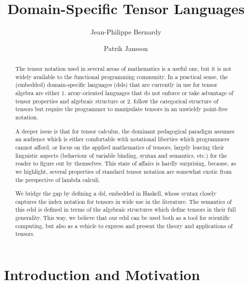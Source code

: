 \documentclass[nolinenum]{jfp}
\begin{document}
\begin{authgrp}\author{Jean-Philippe Bernardy}\author{Patrik Jansson}\end{authgrp}\totalpg{\pageref{lastpage01}}
\title{Domain-Specific Tensor Languages}\begin{abstract} The tensor notation used in several areas of mathematics is a useful
one, but it is not widely available to the functional programming
community. In a practical sense, the (embedded) domain-specific
languages ({\sc{}dsl}s) that are currently in use for tensor algebra are either 1.
array-oriented languages that do not enforce or take advantage of
tensor properties and algebraic structure or 2. follow the categorical
structure of tensors but require the programmer to manipulate tensors
in an unwieldy point-free notation.

A deeper issue is that for tensor calculus, the dominant pedagogical paradigm
assumes an audience which is either
comfortable with notational liberties which programmers cannot afford,
or focus on the applied mathematics of tensors, largely leaving their
linguistic aspects (behaviour of variable binding, syntax and
semantics, etc.) for the reader to figure out by themselves.
This state of affairs is hardly surprising, because, as we highlight,
several properties of standard tensor notation are somewhat
exotic from the perspective of lambda calculi.

 We bridge the gap by defining a {\sc{}dsl}, embedded in Haskell, whose
syntax closely captures the index notation for tensors in wide use in
the literature.  The semantics of this {\sc{}edsl} is defined in terms of the
algebraic structures which define tensors in their full generality.
This way, we believe that our {\sc{}edsl} can be used both as a tool for
scientific computing, but also as a vehicle to express and present
the theory and applications of tensors.
 \end{abstract}\maketitle{} \section{Introduction and Motivation}\label{0} 
\end{document}

